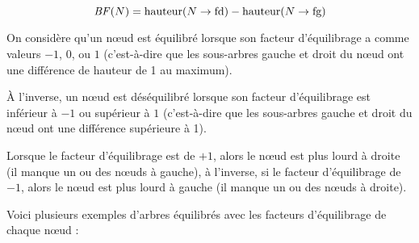 \documentclass[11pt,a4paper,twoside]{article}
\begin{document}
\begin{equation*}
\text{\textit{BF}}(N) = \text{hauteur}(N\rightarrow\text{fd}) - \text{hauteur}(N\rightarrow\text{fg})
\end{equation*}

\bigskip

On considère qu'un nœud est équilibré lorsque son facteur d'équilibrage a comme valeurs $ -1 $, $ 0 $, ou $ 1 $ (c'est-à-dire que les sous-arbres gauche et droit du nœud ont une différence de hauteur de 1 au maximum).

À l'inverse, un nœud est déséquilibré lorsque son facteur d'équilibrage est inférieur à $ -1 $ ou supérieur à $ 1 $ (c'est-à-dire que les sous-arbres gauche et droit du nœud ont une différence supérieure à 1).

\bigskip

Lorsque le facteur d'équilibrage est de $ +1 $, alors le nœud est plus lourd à droite (il manque un ou des nœuds à gauche), à l'inverse, si le facteur d'équilibrage de $ -1 $, alors le nœud est plus lourd à gauche (il manque un ou des nœuds à droite).

\bigskip

Voici plusieurs exemples d'arbres équilibrés avec les facteurs d'équilibrage de chaque nœud :

\medskip

\vfillFirst
\end{document}
